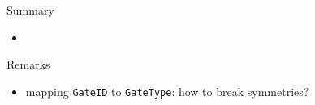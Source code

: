 \documentclass[10pt,dvipsnames]{beamer}
\begin{document}
\begin{frame}{Summary}
 \begin{itemize}
  \item 
  
 \end{itemize}

\end{frame}



\begin{frame}{Remarks}
 \begin{itemize}
  \item mapping \texttt{GateID} to \texttt{GateType}: how to break symmetries?
 \end{itemize}

\end{frame}
\end{document}
